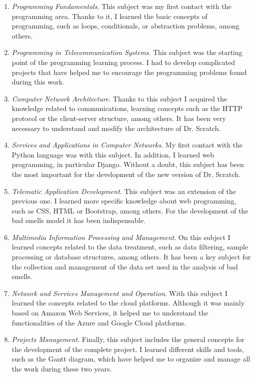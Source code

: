\begin{enumerate}
  \item \textit{Programming Fundamentals}. This subject was my first contact with the programming area. Thanks to it, I learned the basic concepts of programming, such as loops, conditionals, or abstraction problems, among others. 
  \item \textit{Programming in Telecommunication Systems}. This subject was the starting point of the programming learning process. I had to develop complicated projects that have helped me to encourage the programming problems found during this work.
  \item \textit{Computer Network Architecture}. Thanks to this subject I acquired the knowledge related to communications, learning concepts such as the HTTP protocol or the client-server structure, among others. It has been very necessary to understand and modify the architecture of Dr. Scratch.  
  \item \textit{Services and Applications in Computer Networks}. My first contact with the Python language was with this subject. In addition, I learned web programming, in particular Django. Without a doubt, this subject has been the most important for the development of the new version of Dr. Scratch.
  \item \textit{Telematic Application Development}. This subject was an extension of the previous one. I learned more specific knowledge about web programming, such as CSS, HTML or Bootstrap, among others. For the development of the bad smells model it has been indispensable. 
  \item \textit{Multimedia Information Processing and Management}. On this subject I learned concepts related to the data treatment, such as data filtering, sample processing or database structures, among others. It has been a key subject for the collection and management of the data set used in the analysis of bad smells. 
  \item \textit{Network and Services Management and Operation}. With this subject I learned the concepts related to the cloud platforms. Although it was mainly based on Amazon Web Services, it helped me to understand the functionalities of the Azure and Google Cloud platforms. 
  \item \textit{Projects Management}. Finally, this subject includes the general concepts for the development of the complete project. I learned different skills and tools, such as the Gantt diagram, which have helped me to organize and manage all the work during these two years. 
\end{enumerate}


